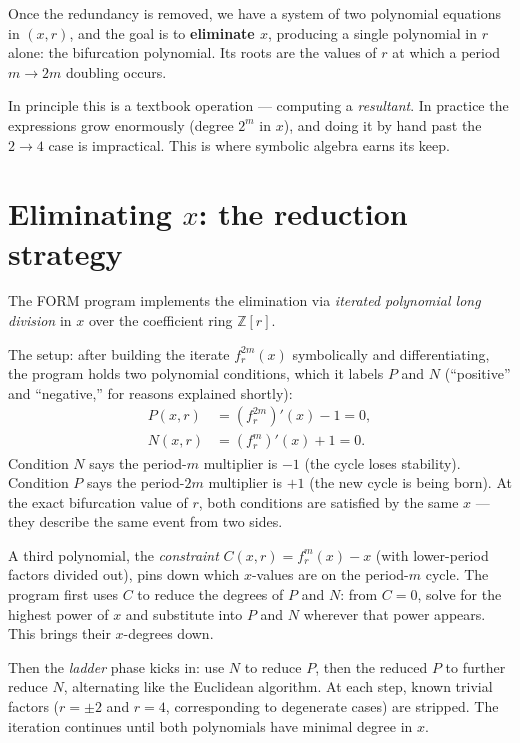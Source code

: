 \documentclass[11pt]{article}
\begin{document}
Once the redundancy is removed, we have a system of two polynomial equations in
$(x,r)$, and the goal is to \textbf{eliminate $x$}, producing a single
polynomial in $r$ alone: the bifurcation polynomial.  Its roots are the values
of $r$ at which a period $m\to 2m$ doubling occurs.

In principle this is a textbook operation --- computing a \emph{resultant}.  In
practice the expressions grow enormously (degree $2^m$ in $x$), and doing it by
hand past the $2\to 4$ case is impractical.  This is where symbolic algebra
earns its keep.

\section{Eliminating $x$: the reduction strategy}
\label{sec:elimination}

The FORM program implements the elimination via \emph{iterated polynomial long
division} in $x$ over the coefficient ring $\mathbb{Z}[r]$.

The setup: after building the iterate $f_r^{2m}(x)$ symbolically and
differentiating, the program holds two polynomial conditions, which it labels
$P$ and $N$ (``positive'' and ``negative,'' for reasons explained shortly):
\begin{align}
P(x,r) &= (f_r^{2m})'(x) - 1 = 0, \label{eq:Pdef}\\
N(x,r) &= (f_r^m)'(x) + 1 = 0. \label{eq:Ndef}
\end{align}
Condition $N$ says the period-$m$ multiplier is $-1$ (the cycle loses
stability).  Condition $P$ says the period-$2m$ multiplier is $+1$ (the new
cycle is being born).  At the exact bifurcation value of $r$, both conditions
are satisfied by the same $x$ --- they describe the same event from two sides.

A third polynomial, the \emph{constraint} $C(x,r)=f_r^m(x)-x$ (with
lower-period factors divided out), pins down which $x$-values are on the
period-$m$ cycle.  The program first uses $C$ to reduce the degrees of $P$ and
$N$: from $C=0$, solve for the highest power of $x$ and substitute into $P$ and
$N$ wherever that power appears.  This brings their $x$-degrees down.

Then the \emph{ladder} phase kicks in: use $N$ to reduce $P$, then the reduced
$P$ to further reduce $N$, alternating like the Euclidean algorithm.  At each
step, known trivial factors ($r=\pm2$ and $r=4$, corresponding to degenerate
cases) are stripped.  The iteration continues until both polynomials have
minimal degree in $x$.
\end{document}
